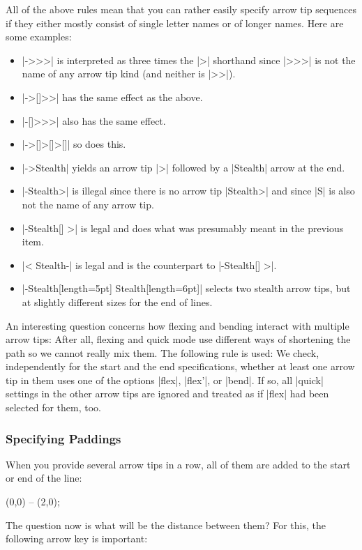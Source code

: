 All of the above rules mean that you can rather easily specify arrow tip
sequences if they either mostly consist of single letter names or of longer
names. Here are some examples:
%
\begin{itemize}
    \item |->>>| is interpreted as three times the |>| shorthand since |>>>| is
        not the name of any arrow tip kind (and neither is |>>|).
    \item |->[]>>| has the same effect as the above.
    \item |-[]>>>| also has the same effect.
    \item |->[]>[]>[]| so does this.
    \item |->Stealth| yields an arrow tip |>| followed by a |Stealth| arrow
        at the end.
    \item |-Stealth>| is illegal since there is no arrow tip |Stealth>| and
        since |S| is also not the name of any arrow tip.
    \item |-Stealth[] >| is legal and does what was presumably meant in the
        previous item.
    \item |< Stealth-| is legal and is the counterpart to |-Stealth[] >|.
    \item |-Stealth[length=5pt] Stealth[length=6pt]| selects two stealth
        arrow tips, but at slightly different sizes for the end of lines.
\end{itemize}

An interesting question concerns how flexing and bending interact with multiple
arrow tips: After all, flexing and quick mode use different ways of shortening
the path so we cannot really mix them. The following rule is used: We check,
independently for the start and the end specifications, whether at least one
arrow tip in them uses one of the options |flex|, |flex'|, or |bend|. If so,
all |quick| settings in the other arrow tips are ignored and treated as if
|flex| had been selected for them, too.


\subsubsection{Specifying Paddings}

When you provide several arrow tips in a row, all of them are added to the
start or end of the line:
%
\begin{codeexample}[]
\tikz \draw [<<<->>>>] (0,0) -- (2,0);
\end{codeexample}
%
The question now is what will be the distance between them? For this, the
following arrow key is important:

